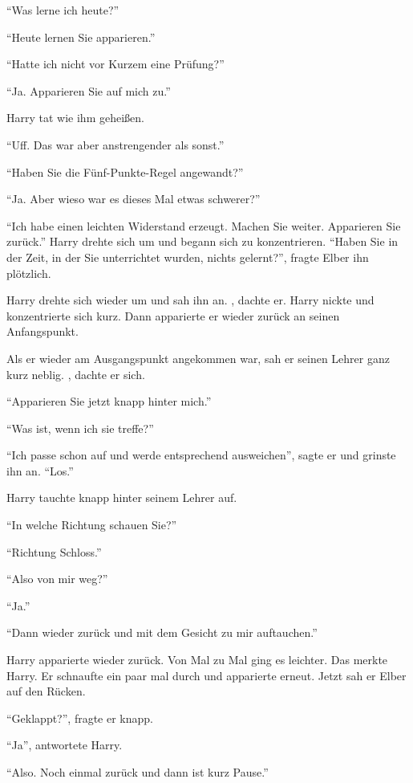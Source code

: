 \enquote{Was lerne ich heute?}

\enquote{Heute lernen Sie apparieren.}

\enquote{Hatte ich nicht vor Kurzem eine Prüfung?}

\enquote{Ja. Apparieren Sie auf mich zu.}

Harry tat wie ihm geheißen.

\enquote{Uff. Das war aber anstrengender als sonst.}

\enquote{Haben Sie die Fünf-Punkte-Regel angewandt?}

\enquote{Ja. Aber wieso war es dieses Mal etwas schwerer?}

\enquote{Ich habe einen leichten Widerstand erzeugt. Machen Sie weiter. Apparieren Sie zurück.} Harry drehte sich um und begann sich zu konzentrieren. \enquote{Haben Sie in der Zeit, in der Sie unterrichtet wurden, nichts gelernt?}, fragte Elber ihn plötzlich.

Harry drehte sich wieder um und sah ihn an. , dachte er.  Harry nickte und konzentrierte sich kurz. Dann apparierte er wieder zurück an seinen Anfangspunkt.

Als er wieder am Ausgangspunkt angekommen war, sah er seinen Lehrer ganz kurz neblig. , dachte er sich.

\enquote{Apparieren Sie jetzt knapp hinter mich.}

\enquote{Was ist, wenn ich sie treffe?}

\enquote{Ich passe schon auf und werde entsprechend ausweichen}, sagte er und grinste ihn an. \enquote{Los.}

Harry tauchte knapp hinter seinem Lehrer auf.

\enquote{In welche Richtung schauen Sie?}

\enquote{Richtung Schloss.}

\enquote{Also von mir weg?}

\enquote{Ja.}

\enquote{Dann wieder zurück und mit dem Gesicht zu mir auftauchen.}

Harry apparierte wieder zurück. Von Mal zu Mal ging es leichter. Das merkte Harry. Er schnaufte ein paar mal durch und apparierte erneut. Jetzt sah er Elber auf den Rücken.

\enquote{Geklappt?}, fragte er knapp.

\enquote{Ja}, antwortete Harry.

\enquote{Also. Noch einmal zurück und dann ist kurz Pause.}

